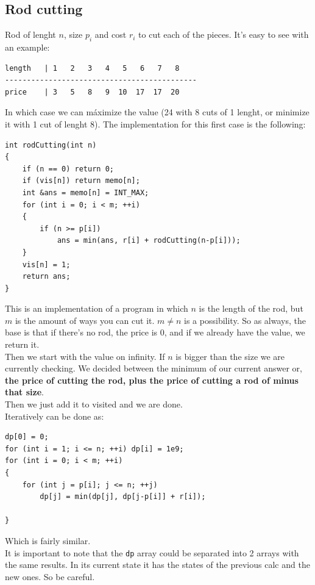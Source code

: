 \documentclass{IEEEtran}
\begin{document}
        \subsection{Rod cutting}
            Rod of lenght $n$, size $p_i$ and cost $r_i$ to cut each of the pieces. It's easy to see with an example:
            \begin{lstlisting}
length   | 1   2   3   4   5   6   7   8  
--------------------------------------------
price    | 3   5   8   9  10  17  17  20
            \end{lstlisting}
            In which case we can máximize the value (24 with 8 cuts of 1 lenght, or minimize it with 1 cut of lenght 8). The implementation for this first case is the following:
            \begin{lstlisting}
int rodCutting(int n) 
{
	if (n == 0) return 0;
	if (vis[n]) return memo[n];
	int &ans = memo[n] = INT_MAX;
    for (int i = 0; i < m; ++i) 
    {
		if (n >= p[i])
			ans = min(ans, r[i] + rodCutting(n-p[i]));
	}
	vis[n] = 1;
	return ans;
}
            \end{lstlisting}
            This is an implementation of a program in which $n$ is the length of the rod, but $m$ is the amount of ways you can cut it. $m \neq n$ is a possibility.
            So as always, the base is that if there's no rod, the price is 0, and if we already have the value, we return it.\\
            Then we start with the value on infinity. If $n$ is bigger than the size we are currently checking. We decided between the minimum of our current answer or, \textbf{the price of cutting the rod, plus the price of cutting a rod of minus that size}.\\
            Then we just add it to visited and we are done.\\
            Iteratively can be done as:
            \begin{lstlisting}
dp[0] = 0;
for (int i = 1; i <= n; ++i) dp[i] = 1e9;
for (int i = 0; i < m; ++i)
{
	for (int j = p[i]; j <= n; ++j) 
		dp[j] = min(dp[j], dp[j-p[i]] + r[i]);
	
}
            \end{lstlisting}
            Which is fairly similar.\\
            It is important to note that the \texttt{dp} array could be separated into 2 arrays with the same results. In its current state it has the states of the previous calc and the new ones. So be careful.
\end{document}

